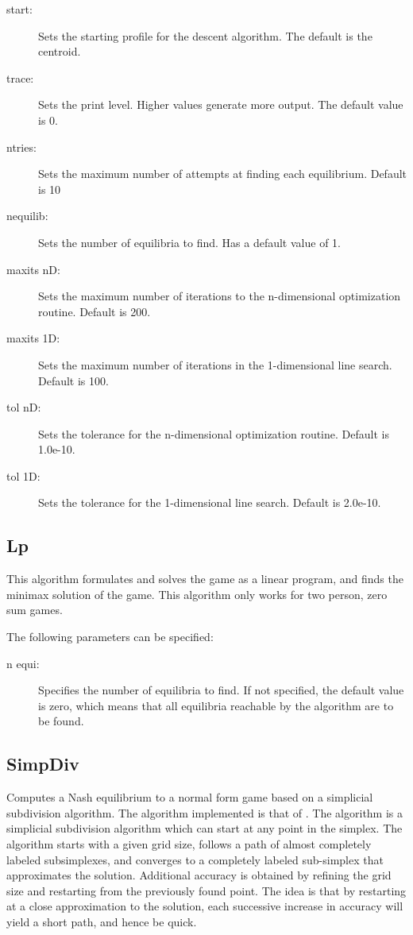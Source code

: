 {\begin{description}
\item[start:] Sets the starting profile for the descent algorithm.  The
default is the centroid.
\item[trace:] Sets the print level.  Higher values generate more output.
The default value is 0.
\item[ntries:] Sets the maximum number of attempts at finding each
equilibrium. Default is 10
\item[nequilib:] Sets the number of equilibria to find.  Has a default
value of 1.  
\item[maxits nD:] Sets the maximum number of iterations to the
n-dimensional optimization routine.  Default is 200.
\item[maxits 1D:] Sets the maximum number of iterations in the
1-dimensional line search.  Default is 100.
\item[tol nD:] Sets the tolerance for the n-dimensional optimization
routine.  Default is 1.0e-10.
\item[tol 1D:] Sets the tolerance for the 1-dimensional line search.
Default is 2.0e-10.
\end{description}

\subsection{Lp}\label{Lp}
This algorithm formulates and solves the game as a linear program, and finds the 
minimax solution of the game.  This algorithm only works for two person, zero sum 
games.    

The following parameters can be specified:

\begin{description}
\item[n equi:] Specifies the number of equilibria to find.  If not specified,
the default value is zero, which means that all equilibria reachable by
the algorithm are to be found.
\end{description}

\subsection{SimpDiv}\label{SimpDiv}
Computes a Nash equilibrium to a normal form game based
on a simplicial subdivision algorithm.  The algorithm implemented is
that of \cite{VTH:1987}.  The algorithm is a simplicial subdivision
algorithm which can start at any point in the simplex.  The algorithm
starts with a given grid size, follows a path of almost completely labeled
subsimplexes, and converges to a completely labeled sub-simplex that
approximates the solution.  Additional accuracy is obtained by refining
the grid size and restarting from the previously found point.  The idea is
that by restarting at a close approximation to the solution, each
successive increase in accuracy will yield a short path, and hence be
quick.

}
